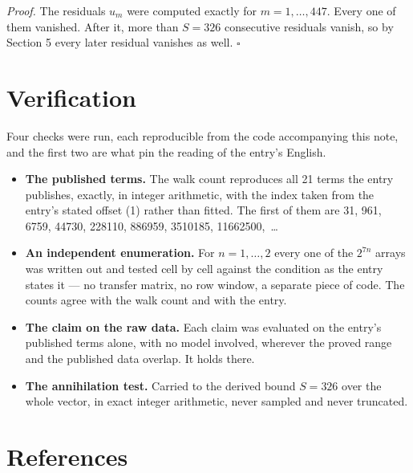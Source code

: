 \documentclass[11pt]{article}
\theoremstyle{definition}
\begin{document}
{\itshape Proof.} The residuals $u_m$ were computed exactly for $m = 1,\dots,447$. Every one of them vanished. After it, more than $S = 326$ consecutive residuals vanish, so by Section 5 every later residual vanishes as well. $\square$

\section{Verification}

Four checks were run, each reproducible from the code accompanying this note, and the first two are what pin the reading of the entry's English.

\begin{itemize}

\item {\bfseries The published terms.} The walk count reproduces all 21 terms the entry publishes, exactly, in integer arithmetic, with the index taken from the entry's stated offset (1) rather than fitted. The first of them are 31, 961, 6759, 44730, 228110, 886959, 3510185, 11662500,~\dots

\item {\bfseries An independent enumeration.} For $n = 1,\dots,2$ every one of the $2^{7n}$ arrays was written out and tested cell by cell against the condition as the entry states it --- no transfer matrix, no row window, a separate piece of code. The counts agree with the walk count and with the entry.

\item {\bfseries The claim on the raw data.} Each claim was evaluated on the entry's published terms alone, with no model involved, wherever the proved range and the published data overlap. It holds there.

\item {\bfseries The annihilation test.} Carried to the derived bound $S = 326$ over the whole vector, in exact integer arithmetic, never sampled and never truncated.

\end{itemize}

\section{References}
\end{document}
